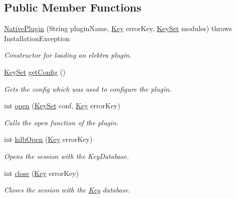 \subsection*{Public Member Functions}
\begin{DoxyCompactItemize}
\item 
\hyperlink{classorg_1_1libelektra_1_1plugin_1_1NativePlugin_ad228084d20bd57c561e49ee755e9c751}{Native\+Plugin} (String plugin\+Name, \hyperlink{classorg_1_1libelektra_1_1Key}{Key} error\+Key, \hyperlink{classorg_1_1libelektra_1_1KeySet}{Key\+Set} modules)  throws Installation\+Exception 	
\begin{DoxyCompactList}\small\item\em Constructor for loading an elektra plugin. \end{DoxyCompactList}\item 
\hyperlink{classorg_1_1libelektra_1_1KeySet}{Key\+Set} \hyperlink{classorg_1_1libelektra_1_1plugin_1_1NativePlugin_af9c78565029ed2ae38241759549e4b5a}{get\+Config} ()
\begin{DoxyCompactList}\small\item\em Gets the config which was used to configure the plugin. \end{DoxyCompactList}\item 
int \hyperlink{classorg_1_1libelektra_1_1plugin_1_1NativePlugin_a81510de92e0d65784e877bf53b89756a}{open} (\hyperlink{classorg_1_1libelektra_1_1KeySet}{Key\+Set} conf, \hyperlink{classorg_1_1libelektra_1_1Key}{Key} error\+Key)
\begin{DoxyCompactList}\small\item\em Calls the open function of the plugin. \end{DoxyCompactList}\item 
int \hyperlink{classorg_1_1libelektra_1_1plugin_1_1NativePlugin_a232c37208b79734c6be8a9f426efa56a}{kdb\+Open} (\hyperlink{classorg_1_1libelektra_1_1Key}{Key} error\+Key)
\begin{DoxyCompactList}\small\item\em Opens the session with the Key\+Database. \end{DoxyCompactList}\item 
int \hyperlink{classorg_1_1libelektra_1_1plugin_1_1NativePlugin_acd6f4e0e81a11a1eba64dfa164c67a1f}{close} (\hyperlink{classorg_1_1libelektra_1_1Key}{Key} error\+Key)
\begin{DoxyCompactList}\small\item\em Closes the session with the \hyperlink{classorg_1_1libelektra_1_1Key}{Key} database. \end{DoxyCompactList}\item 

\end{DoxyCompactItemize}
